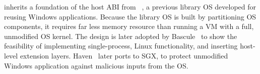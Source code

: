 \graphene{} inherits 
a foundation of the host ABI from \drawbridge{}~\cite{porter11drawbridge},
a previous library OS developed for reusing 
Windows applications.
Because the library OS is built by partitioning OS components,
it requires far less memory resource than running a VM with a full, unmodified OS kernel.
The \drawbridge{} design is later adopted by Bascule~\cite{baumann13bascule}
to show the feasibility of implementing single-process, Linux functionality, and inserting host-level extension layers.
Haven~\cite{baumann14haven} later ports \drawbridge{} to SGX,
to protect unmodified Windows application against malicious inputs from the OS.



 





